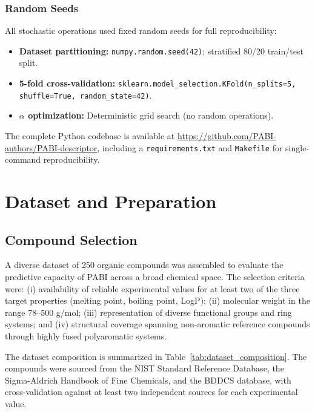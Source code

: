 \documentclass[12pt,a4paper]{article}
\begin{document}
\subsubsection{Random Seeds}

All stochastic operations used fixed random seeds for full reproducibility:

\begin{itemize}[leftmargin=2em]
\item \textbf{Dataset partitioning:} \texttt{numpy.random.seed(42)}; stratified 80/20 train/test split.
\item \textbf{5-fold cross-validation:} \texttt{sklearn.model\_selection.KFold(n\_splits=5, shuffle=True, random\_state=42)}.
\item \textbf{$\alpha$ optimization:} Deterministic grid search (no random operations).
\end{itemize}

The complete Python codebase is available at \url{https://github.com/PABI-authors/PABI-descriptor}, including a \texttt{requirements.txt} and \texttt{Makefile} for single-command reproducibility.

\section{Dataset and Preparation}
\label{sec:dataset}

\subsection{Compound Selection}

A diverse dataset of 250 organic compounds was assembled to evaluate the predictive capacity of PABI across a broad chemical space. The selection criteria were: (i) availability of reliable experimental values for at least two of the three target properties (melting point, boiling point, LogP); (ii) molecular weight in the range 78--500 g/mol; (iii) representation of diverse functional groups and ring systems; and (iv) structural coverage spanning non-aromatic reference compounds through highly fused polyaromatic systems.

The dataset composition is summarized in Table~\ref{tab:dataset_composition}. The compounds were sourced from the NIST Standard Reference Database\cite{nist2024}, the Sigma-Aldrich Handbook of Fine Chemicals\cite{aldrich2022handbook}, and the BDDCS database\cite{benet2016bddcs}, with cross-validation against at least two independent sources for each experimental value.
\end{document}

